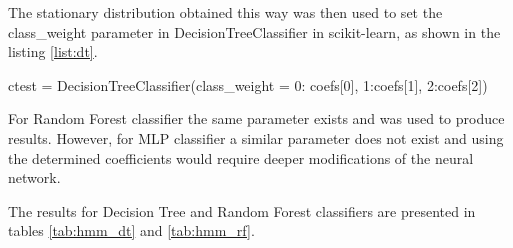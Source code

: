 The stationary distribution obtained this way was then used to set the class\_weight parameter in DecisionTreeClassifier in scikit-learn, as shown in the listing \ref{list:dt}.

\begin{python}[caption = {Definition of the Decision Tree Classifier taking into consideration the stationary distribution}, label = list:dt]
ctest = DecisionTreeClassifier(class_weight = {0: coefs[0], 1:coefs[1], 2:coefs[2]})  
\end{python}

For Random Forest classifier the same parameter exists and was used to produce results. However, for MLP classifier a similar parameter does not exist and using the determined coefficients would require deeper modifications of the neural network.

The results for Decision Tree and Random Forest classifiers are presented in tables \ref{tab:hmm_dt} and \ref{tab:hmm_rf}.

